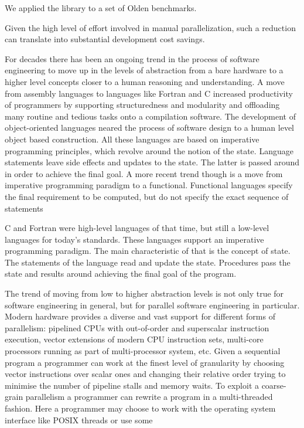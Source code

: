 We applied the library to a set of Olden benchmarks.

%
Given the high level of effort involved in manual parallelization, such a reduction can translate into substantial development cost savings.


\quad For decades there has been an ongoing trend in the process of software engineering to move up in the levels of abstraction from a bare hardware to a higher level concepts closer to a human reasoning and understanding.\newline\null
\quad A move from assembly languages to languages like Fortran and C increased productivity of programmers by supporting structuredness and modularity and offloading many routine and tedious tasks onto a compilation software. The development of object-oriented languages neared the process of software design to a human level object based construction. All these languages are based on imperative programming principles, which revolve around the notion of the state. Language statements leave side effects and updates to the state. The latter is passed around in order to achieve the final goal. A more recent trend though is a move from imperative programming paradigm to a functional. Functional languages specify the final requirement to be computed, but do not specify the exact sequence of statements   


C and Fortran were high-level languages of that time, but still a low-level languages for today's standards. These languages support an imperative programming paradigm. The main characteristic of that is the concept of state. The statements of the language read and update the state. Procedures pass the state and results around achieving the final goal of the program.   

\quad The trend of moving from low to higher abstraction levels is not only true for software engineering in general, but for parallel software engineering in particular. Modern hardware provides a diverse and vast support for different forms of parallelism: pipelined CPUs with out-of-order and superscalar instruction execution, vector extensions of modern CPU instruction sets, multi-core processors running as part of multi-processor system, etc. Given a sequential program a programmer can work at the finest level of granularity by choosing vector instructions over scalar ones and changing their relative order trying to minimise the number of pipeline stalls and memory waits. To exploit a coarse-grain parallelism a programmer can rewrite a program in a multi-threaded fashion. Here a programmer may choose to work with the operating system interface like POSIX threads or use some 

